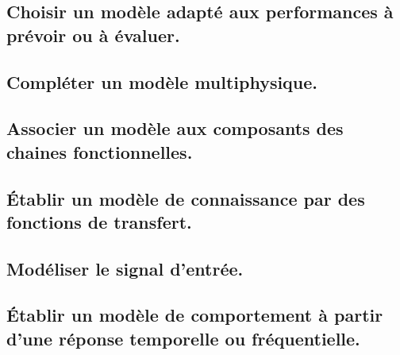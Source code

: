 \documentclass[10pt,fleqn]{book}
\newcommand{\repRel}{../..}
\newcommand{\repStyle}{\repRel/Style}
\newcommand{\td}{fichier_td}
\newcommand{\repExos}{\repRel/ExercicesCompetences}
\newcommand{\repExo}{dossier}
\begin{document}
\subsection{Choisir un modèle adapté aux performances à prévoir ou à évaluer.} 

\subsection{Compléter un modèle multiphysique.} 

\subsection{Associer un modèle aux composants des chaines fonctionnelles.} 

\subsection{Établir un modèle de connaissance par des fonctions de transfert.} 

\renewcommand{\repExo}{\repExos/B2_ProposerModele/B2_04_ModeleConnaissance/51_MCC}
\renewcommand{\td}{51_MCC}
\graphicspath{{\repStyle/png/}{\repExo/images/}}


\subsection{Modéliser le signal d'entrée.} 

\subsection{Établir un modèle de comportement à partir d'une réponse temporelle ou fréquentielle. } 

\renewcommand{\repExo}{\repExos/B2_ProposerModele/B2_06_ModeleComportement/502_Divers}
\renewcommand{\td}{502_Divers}
\graphicspath{{\repStyle/png/}{\repExo/images/}}


\renewcommand{\repExo}{\repExos/B2_ProposerModele/B2_06_ModeleComportement/503_Divers}
\renewcommand{\td}{503_Divers}
\graphicspath{{\repStyle/png/}{\repExo/images/}}


\renewcommand{\repExo}{\repExos/B2_ProposerModele/B2_06_ModeleComportement/504_Divers}
\renewcommand{\td}{504_Divers}
\graphicspath{{\repStyle/png/}{\repExo/images/}}


\renewcommand{\repExo}{\repExos/B2_ProposerModele/B2_06_ModeleComportement/506_Divers}
\renewcommand{\td}{506_Divers}
\graphicspath{{\repStyle/png/}{\repExo/images/}}

\end{document}
